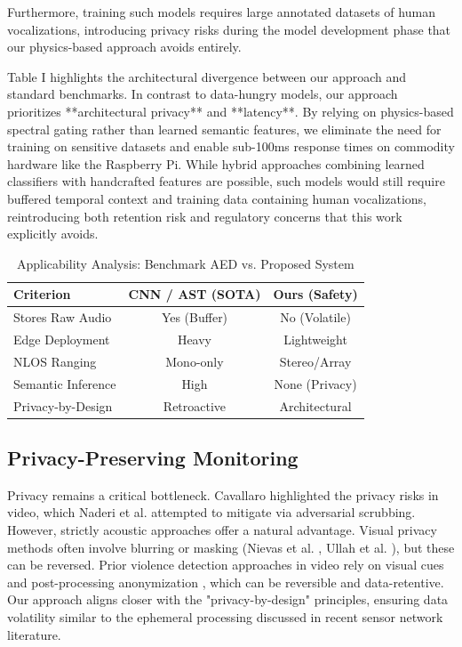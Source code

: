 \documentclass[conference]{IEEEtran}
\begin{document}
Furthermore, training such models requires large annotated datasets of human vocalizations, introducing privacy risks during the model development phase that our physics-based approach avoids entirely.

Table I highlights the architectural divergence between our approach and standard benchmarks. In contrast to data-hungry models, our approach prioritizes **architectural privacy** and **latency**. By relying on physics-based spectral gating rather than learned semantic features, we eliminate the need for training on sensitive datasets and enable sub-100ms response times on commodity hardware like the Raspberry Pi. While hybrid approaches combining learned classifiers with handcrafted features are possible, such models would still require buffered temporal context and training data containing human vocalizations, reintroducing both retention risk and regulatory concerns that this work explicitly avoids.

\begin{table}[htbp]
\caption{Applicability Analysis: Benchmark AED vs. Proposed System}
\begin{center}
\begin{tabular}{lcc}
\toprule
\textbf{Criterion} & \textbf{CNN / AST (SOTA)} & \textbf{Ours (Safety)} \\
\midrule
Stores Raw Audio & Yes (Buffer) & No (Volatile) \\
Edge Deployment & Heavy & Lightweight \\
NLOS Ranging & Mono-only & Stereo/Array \\
Semantic Inference & High & None (Privacy) \\
Privacy-by-Design & Retroactive & Architectural \\
\bottomrule
\end{tabular}
\end{center}
\label{tab:comparison}
\end{table}

\subsection{Privacy-Preserving Monitoring}
Privacy remains a critical bottleneck. Cavallaro \cite{b1} highlighted the privacy risks in video, which Naderi et al. \cite{b4} attempted to mitigate via adversarial scrubbing. However, strictly acoustic approaches offer a natural advantage. Visual privacy methods often involve blurring or masking (Nievas et al. \cite{b16}, Ullah et al. \cite{b17}), but these can be reversed. Prior violence detection approaches in video rely on visual cues and post-processing anonymization \cite{b16, b17}, which can be reversible and data-retentive. Our approach aligns closer with the "privacy-by-design" principles, ensuring data volatility similar to the ephemeral processing discussed in recent sensor network literature.
\end{document}
